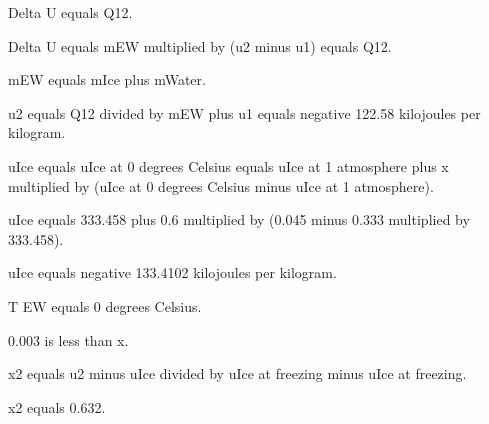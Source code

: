 Delta U equals Q12.  

Delta U equals mEW multiplied by (u2 minus u1) equals Q12.  

mEW equals mIce plus mWater.  

u2 equals Q12 divided by mEW plus u1 equals negative 122.58 kilojoules per kilogram.  

uIce equals uIce at 0 degrees Celsius equals uIce at 1 atmosphere plus x multiplied by (uIce at 0 degrees Celsius minus uIce at 1 atmosphere).  

uIce equals 333.458 plus 0.6 multiplied by (0.045 minus 0.333 multiplied by 333.458).  

uIce equals negative 133.4102 kilojoules per kilogram.  

T EW equals 0 degrees Celsius.  

0.003 is less than x.  

x2 equals u2 minus uIce divided by uIce at freezing minus uIce at freezing.  

x2 equals 0.632.
